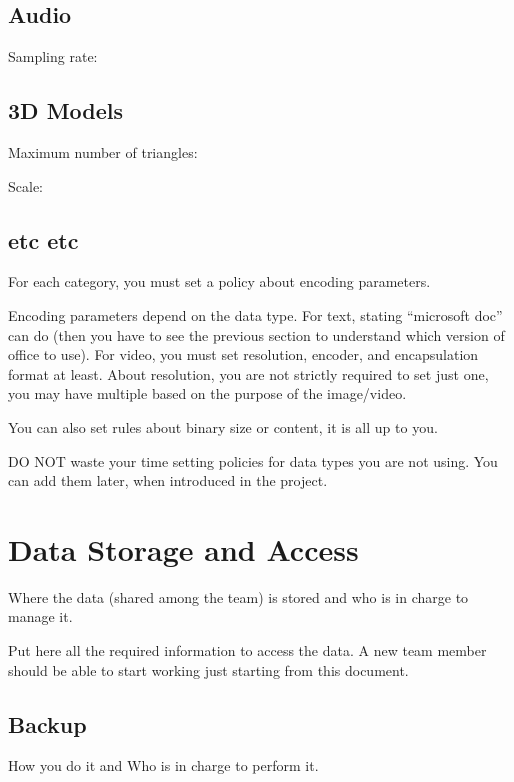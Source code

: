 \documentclass[12pt]{article}
\begin{document}
\subsection{Audio}
Sampling rate:

\subsection{3D Models}
Maximum number of triangles:

Scale: 

\subsection{etc etc}
For each category, you must set a policy about encoding parameters.

Encoding parameters depend on the data type. For text, stating “microsoft doc” can do (then you have to see the previous section to understand which version of office to use). For video, you must set resolution, encoder, and encapsulation format at least. About resolution, you are not strictly required to set just one, you may have multiple based on the purpose of the image/video.

You can also set rules about binary size or content, it is all up to you.

DO NOT waste your time setting policies for data types you are not using. You can add them later, when introduced in the project.

\section{Data Storage and Access}
Where the data (shared among the team) is stored and who is in charge to manage it.

Put here all the required information to access the data. A new team member should be able to start working just starting from this document.

\subsection{Backup}
How you do it and Who is in charge to perform it.
\end{document}
